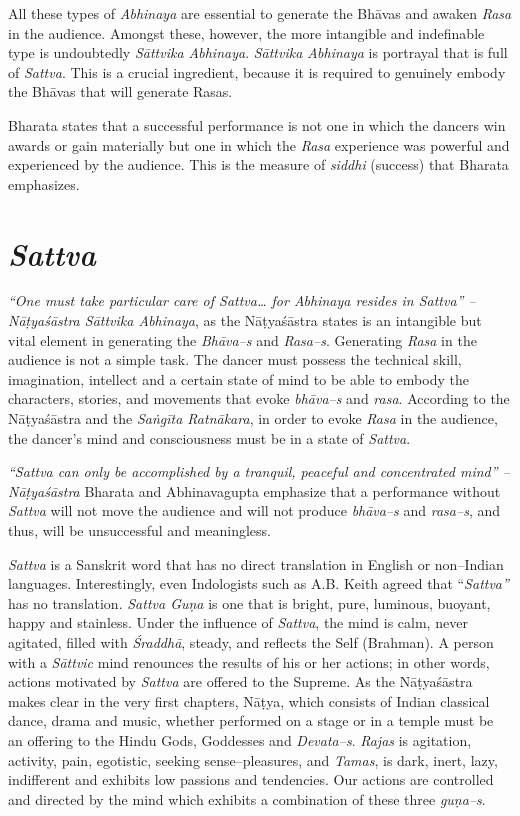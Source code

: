 All these types of \textit{Abhinaya} are essential to generate the Bhāvas and awaken \textit{Rasa} in the audience. Amongst these, however, the more intangible and indefinable type is undoubtedly \textit{Sāttvika Abhinaya}. \textit{Sāttvika Abhinaya} is portrayal that is full of \textit{Sattva}. This is a crucial ingredient, because it is required to genuinely embody the Bhāvas that will generate Rasas.

Bharata states that a successful performance is not one in which the dancers win awards or gain materially but one in which the \textit{Rasa} experience was powerful and experienced by the audience. This is the measure of \textit{siddhi} (success) that Bharata emphasizes.


\section*{\textit{Sattva}}

\textit{“One must take particular care of Sattva… for Abhinaya resides in Sattva” –Nāṭyaśāstra Sāttvika Abhinaya}, as the Nāṭyaśāstra states is an intangible but vital element in generating the \textit{Bhāva–s} and \textit{Rasa–s}. Generating \textit{Rasa} in the audience is not a simple task. The dancer must possess the technical skill, imagination, intellect and a certain state of mind to be able to embody the characters, stories, and movements that evoke \textit{bhāva–s} and \textit{rasa}. According to the Nāṭyaśāstra and the \textit{Saṅgīta Ratnākara}, in order to evoke \textit{Rasa} in the audience, the dancer’s mind and consciousness must be in a state of \textit{Sattva}.

\newpage

\textit{“Sattva can only be accomplished by a tranquil, peaceful and concentrated mind” –Nāṭyaśāstra} Bharata and Abhinavagupta emphasize that a performance without \textit{Sattva} will not move the audience and will not produce \textit{bhāva–s} and \textit{rasa–s}, and thus, will be unsuccessful and meaningless. 

\textit{Sattva} is a Sanskrit word that has no direct translation in English or non–Indian languages. Interestingly, even Indologists such as A.B. Keith agreed that “\textit{Sattva”} has no translation. \textit{Sattva Guṇa} is one that is bright, pure, luminous, buoyant, happy and stainless. Under the influence of \textit{Sattva}, the mind is calm, never agitated, filled with \textit{Śraddhā}, steady, and reflects the Self (Brahman). A person with a \textit{Sāttvic} mind renounces the results of his or her actions; in other words, actions motivated by \textit{Sattva} are offered to the Supreme. As the Nāṭyaśāstra makes clear in the very first chapters, Nāṭya, which consists of Indian classical dance, drama and music, whether performed on a stage or in a temple must be an offering to the Hindu Gods, Goddesses and \textit{Devata–s}. \textit{Rajas} is agitation, activity, pain, egotistic, seeking sense–pleasures, and \textit{Tamas}, is dark, inert, lazy, indifferent and exhibits low passions and tendencies. Our actions are controlled and directed by the mind which exhibits a combination of these three \textit{guṇa–s}.

